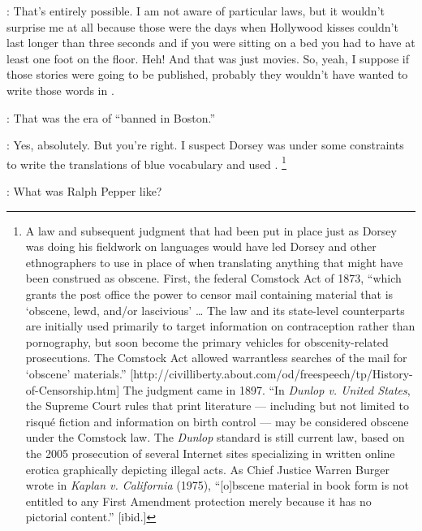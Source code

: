 \documentclass[output=paper]{LSP/langsci}
\begin{document}
: That's entirely possible. I am not aware of particular laws, but it wouldn't surprise me at all because those were the days when Hollywood kisses couldn't last longer than three seconds and if you were sitting on a bed you had to have at least one foot on the floor. Heh! And that was just movies. So, yeah, I suppose if those stories were going to be published, probably they wouldn't have wanted to write those words in .

: That was the era of ``banned in Boston.''

: Yes, absolutely. But you're right. I suspect Dorsey was under some constraints to write the translations of blue vocabulary and used . \footnote{A law and subsequent judgment that had been put in place just as Dorsey was doing his fieldwork on  languages would have led Dorsey and other ethnographers to use  in place of  when translating anything that might have been construed as obscene.  First, the federal Comstock Act of 1873, ``which grants the post office the power to censor mail containing material that is `obscene, lewd, and/or lascivious' {\ldots} The law and its state-level counterparts are initially used primarily to target information on contraception rather than pornography, but soon become the primary vehicles for obscenity-related prosecutions. The Comstock Act allowed warrantless searches of the mail for `obscene' materials.'' [{http://civilliberty.about.com/od/freespeech/tp/History-of-Censorship.htm}] The judgment came in 1897. ``In \textit{Dunlop v. United States}, the Supreme Court rules that print literature --- including but not limited to risqu\'e fiction and information on birth control --- may be considered obscene under the Comstock law. The \textit{Dunlop} standard is still current law, based on the 2005 prosecution of several Internet sites specializing in written online erotica graphically depicting illegal acts. As Chief Justice Warren Burger wrote in \textit{Kaplan v. California} (1975), ``[o]bscene material in book form is not entitled to any First Amendment protection merely because it has no pictorial content.''  [ibid.] }

: What was Ralph Pepper like?
\end{document}
